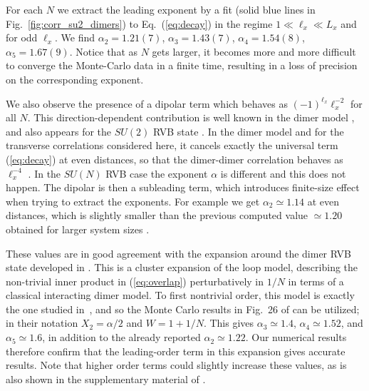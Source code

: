 \documentclass[11pt]{iopart}
\begin{document}
For each $N$ we extract the leading exponent by a fit (solid blue lines in Fig.~\ref{fig:corr_su2_dimers}) to Eq.~(\ref{eq:decay}) in the regime $1\ll \ell_x \ll L_x$ and for odd $\ell_x$. We find $\alpha_2=1.21(7)$, $\alpha_3=1.43(7)$, $\alpha_4=1.54(8)$, $\alpha_5=1.67(9)$. Notice that as $N$ gets larger, it becomes more and more difficult to converge the Monte-Carlo data in a finite time, resulting in a loss of precision on the corresponding exponent. 

We also observe the presence of a dipolar term which behaves as $(-1)^{\ell_x} \ell_x^{-2}$ for all $N$. This direction-dependent contribution is well known in the dimer model \cite{Alet_dimers2}, and also appears for the $SU(2)$ RVB state \cite{RVB2}. In the dimer model and for the transverse correlations considered here, it cancels exactly the universal term (\ref{eq:decay}) at even distances, so that the dimer-dimer correlation behaves as $\ell_x^{-4}$ \cite{FisherStephenson}. In the $SU(N)$ RVB case the exponent $\alpha$ is different and this does not happen. The dipolar is then a subleading term, which introduces finite-size effect when trying to extract the exponents. For example we get $\alpha_2\simeq 1.14$ at even distances, which is slightly smaller than the previous computed value $\simeq 1.20$ obtained for larger system sizes \cite{RVB1,RVB2}.

These values are in good agreement with the expansion around the dimer RVB state developed in \cite{Damle}. This is a cluster expansion of the loop model, describing the non-trivial inner product in (\ref{eq:overlap}) perturbatively in $1/N$ in terms of a classical interacting dimer model. 
To first nontrivial order, this model is exactly the one studied in \,\cite{Alet_dimers1,Alet_dimers2}, and so the Monte Carlo results in Fig.\ 26 of \cite{Alet_dimers2} can be utilized; in their notation $X_2=\alpha/2$ and $W=1+1/N$. This gives $\alpha_3 \simeq 1.4$, $\alpha_4 \simeq 1.52$, and $\alpha_5\simeq 1.6$, in addition to the already reported $\alpha_2\simeq 1.22$. Our numerical results therefore confirm that the leading-order term in this expansion gives accurate results. Note that higher order terms could slightly increase these values, as is also shown in the supplementary material of \cite{Damle}.
\end{document}
